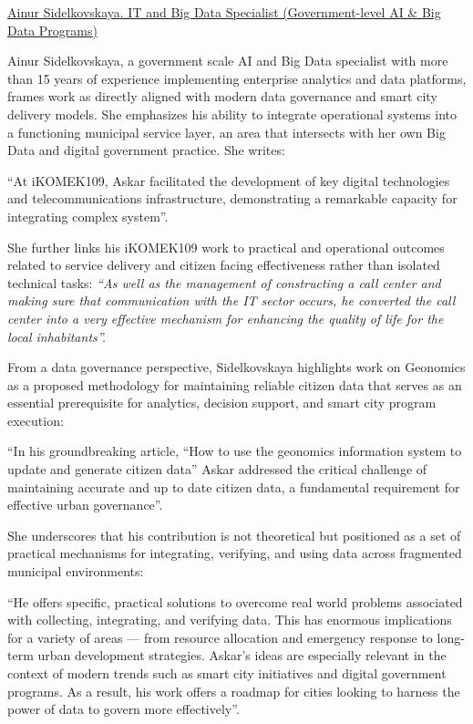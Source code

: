 \bigskip
\noindent\underline{Ainur Sidelkovskaya. IT and Big Data Specialist (Government-level AI \& Big Data Programs)}

Ainur Sidelkovskaya, a government scale AI and Big Data specialist with more than 15 years of experience implementing enterprise analytics and data platforms, frames \mrls work as directly aligned with modern data governance and smart city delivery models. She emphasizes his ability to integrate operational systems into a functioning municipal service layer, an area that intersects with her own Big Data and digital government practice. She writes:
\begin{fullquote}
``At iKOMEK109, Askar facilitated the development of key digital technologies and telecommunications infrastructure, demonstrating a remarkable capacity for integrating complex system''.
\end{fullquote}

She further links his iKOMEK109 work to practical and operational outcomes related to service delivery and citizen facing effectiveness rather than isolated technical tasks:
\emph{``As well as the management of constructing a call center and making sure that communication with the IT sector occurs, he converted the call center into a very effective mechanism for enhancing the quality of life for  the local inhabitants''.}

From a data governance perspective, Sidelkovskaya highlights \mrls work on Geonomics as a proposed methodology for maintaining reliable citizen data that serves as an essential prerequisite for analytics, decision support, and smart city program execution:
\begin{fullquote}
``In his groundbreaking article, ``How to use the geonomics information system to update and generate citizen data'' Askar addressed the critical challenge of maintaining accurate and up to date citizen data, a fundamental requirement for effective urban governance''.
\end{fullquote}

She underscores that his contribution is not theoretical but positioned as a set of practical mechanisms for integrating, verifying, and using data across fragmented municipal environments:
\begin{fullquote}
``He offers specific, practical solutions to overcome real world problems associated with collecting, integrating, and verifying data. This has enormous implications for a variety of areas --- from resource allocation and emergency response to long-term urban development strategies. Askar’s ideas are especially relevant in the context of modern trends such as smart city initiatives and digital government programs. As a result, his work offers a roadmap for cities looking to harness the power of data to govern more effectively''.
\end{fullquote}

